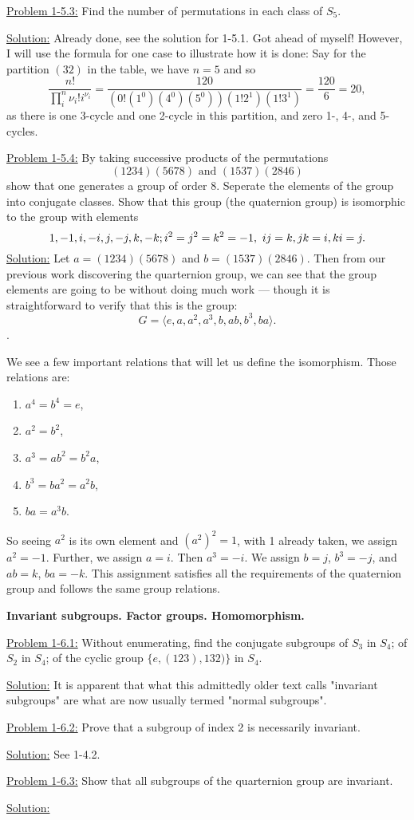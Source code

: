 \documentclass[12pt]{article}
\begin{document}
\underline{Problem 1-5.3:} Find the number of permutations in each class of
$S_5$.

\underline{Solution:} Already done, see the solution for 1-5.1. Got ahead of
myself! However, I will use the formula for one case to illustrate how it is
done: Say for the partition $(32)$ in the table, we have $n=5$ and so
\[
    \frac{n!}{\prod_i^n \nu_i! i^{\nu_i}} = \frac{120}{(0!(1^0)(4^0)(5^0))
    (1!2^1)(1!3^1)} = \frac{120}{6} = 20,
\]
as there is one 3-cycle and one 2-cycle in this partition, and zero 1-, 4-, and
5-cycles.

\underline{Problem 1-5.4:} By taking successive products of the permutations 
\[
    (1234)(5678) \text{      and       } (1537)(2846)
\]
show that one generates a group of order 8. Seperate the elements of the
group into conjugate classes. Show that this group (the quaternion group) is
isomorphic to the group with elements
\[
1, -1, i, -i, j, -j, k, -k; \\
i^2 = j^2 = k^2 = -1, \text{  } ij = k, jk = i, ki = j.
\]
\underline{Solution:} Let $a = (1234)(5678)$ and $b = (1537)(2846)$. Then from
our previous work discovering the quarternion group, we can see that the group
elements are going to be without doing much work --- though it is
straightforward to verify that this is the group:
\[
G = \langle e, a, a^2, a^3, b, ab, b^3, ba \rangle.
\].

We see a few important relations that will let us define the isomorphism. Those
relations are:
\begin{enumerate}
    \item $a^4 = b^4 = e$,
    \item $a^2 = b^2$,
    \item $a^3 =ab^2 = b^2a$,
    \item $b^3 =ba^2 = a^2b$,
    \item $ba = a^3b$.
\end{enumerate}

So seeing $a^2$ is its own element and $(a^2)^2 = 1$, with 1 already taken, we
assign $a^2 = -1$. Further, we assign $a = i$. Then $a^3 = -i$. We assign
$b = j$, $b^3 = -j$, and $ab = k$, $ba = -k$. This assignment satisfies all the
requirements of the quaternion group and follows the same group relations.

\newpage

\textbf{Invariant subgroups. Factor groups. Homomorphism.}

\underline{Problem 1-6.1:} Without enumerating, find the conjugate subgroups of
$S_3$ in $S_4$; of $S_2$ in $S_4$; of the cyclic group $\{e , (123), 132) \}$
in $S_4$. 

\underline{Solution:} It is apparent that what this admittedly older text calls
"invariant subgroups" are what are now usually termed "normal subgroups".

\underline{Problem 1-6.2:} Prove that a subgroup of index 2 is necessarily
invariant. 

\underline{Solution:} See 1-4.2.

\underline{Problem 1-6.3:} Show that all subgroups of the quarternion group are
invariant.

\underline{Solution:} 
\end{document}
